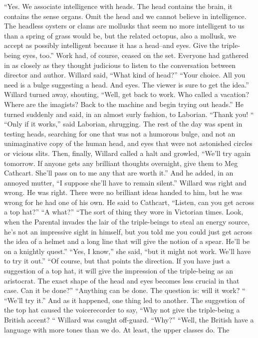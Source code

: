 \documentclass[a4paper,12pt]{article}
\begin{document}
“Yes. We associate intelligence with heads. The head contains the brain, it contains the sense
organs. Omit the head and we cannot believe in intelligence. The headless oysters or clams are mollusks
that seem no more intelligent to us than a spring of grass would be, but the related octopus, also a mollusk,
we accept as possibly intelligent because it has a head--and eyes. Give the triple-being eyes, too.”
Work had, of course, ceased on the set. Everyone had gathered in as closely as they thought
judicious to listen to the conversation between director and author.
Willard said, “What kind of head?”
“Your choice. All you need is a bulge suggesting a head. And eyes. The viewer is sure to get the
idea.”
Willard turned away, shouting, “Well, get back to work. Who called a vacation? Where are the
imagists? Back to the machine and begin trying out heads.”
He turned suddenly and said, in an almost surly fashion, to Laborian. “Thank you! “
“Only if it works,” said Laborian, shrugging.
The rest of the day was spent in testing heads, searching for one that was not a humorous bulge,
and not an unimaginative copy of the human head, and eyes that were not astonished circles or vicious slits.
Then, finally, Willard called a halt and growled, “We’ll try again tomorrow. If anyone gets any brilliant
thoughts overnight, give them to Meg Cathcart. She’ll pass on to me any that are worth it.” And he added,
in an annoyed mutter, “I suppose she’ll have to remain silent.”
Willard was right and wrong. He was right. There were no brilliant ideas handed to him, but he
was wrong for he had one of his own.
He said to Cathcart, “Listen, can you get across a top hat?”
“A what?”
“The sort of thing they wore in Victorian times. Look, when the Parental invades the lair of the
triple-beings to steal an energy source, he’s not an impressive sight in himself, but you told me you could
just get across the idea of a helmet and a long line that will give the notion of a spear. He’ll be on a knightly
quest.”
“Yes, I know,” she said, “but it might not work. We’ll have to try it out.”
“Of course, but that points the direction. If you have just a suggestion of a top hat, it will give the
impression of the triple-being as an aristocrat. The exact shape of the head and eyes becomes less crucial in
that case. Can it be done?”
“Anything can be done. The question is: will it work? “
“We’ll try it.”
And as it happened, one thing led to another. The suggestion of the top hat caused the voicerecorder
to say, “Why not give the triple-being a British accent? “
Willard was caught off-guard. “Why?”
“Well, the British have a language with more tones than we do. At least, the upper classes do. The
\end{document}
